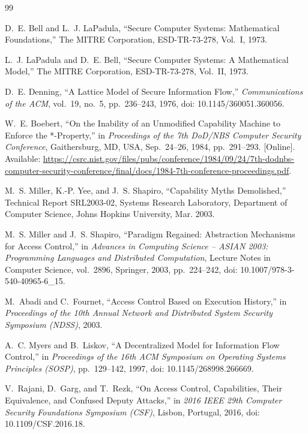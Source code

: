 \documentclass[10pt,twocolumn]{article}
\begin{document}
\begin{thebibliography}{99}

D.~E. Bell and L.~J. LaPadula,
``Secure Computer Systems: Mathematical Foundations,''
The MITRE Corporation, ESD-TR-73-278, Vol.~I, 1973.

L.~J. LaPadula and D.~E. Bell,
``Secure Computer Systems: A Mathematical Model,''
The MITRE Corporation, ESD-TR-73-278, Vol.~II, 1973.

D.~E. Denning,
``A Lattice Model of Secure Information Flow,''
\emph{Communications of the ACM}, vol.~19, no.~5, pp.~236--243, 1976,
doi: 10.1145/360051.360056.

W.~E. Boebert,
``On the Inability of an Unmodified Capability Machine to Enforce the *-Property,''
in \emph{Proceedings of the 7th DoD/NBS Computer Security Conference},
Gaithersburg, MD, USA, Sep.~24--26, 1984, pp.~291--293.
[Online]. Available: \url{https://csrc.nist.gov/files/pubs/conference/1984/09/24/7th-dodnbs-computer-security-conference/final/docs/1984-7th-conference-proceedings.pdf}.

M.~S. Miller, K.-P. Yee, and J.~S. Shapiro,
``Capability Myths Demolished,''
Technical Report SRL2003-02, Systems Research Laboratory,
Department of Computer Science, Johns Hopkins University, Mar. 2003.

M.~S. Miller and J.~S. Shapiro,
``Paradigm Regained: Abstraction Mechanisms for Access Control,''
in \emph{Advances in Computing Science -- ASIAN 2003: Programming Languages and Distributed Computation},
Lecture Notes in Computer Science, vol.~2896, Springer, 2003,
pp.~224--242, doi: 10.1007/978-3-540-40965-6\_15.

M.~Abadi and C.~Fournet,
``Access Control Based on Execution History,''
in \emph{Proceedings of the 10th Annual Network and Distributed System Security Symposium (NDSS)},
2003.

A.~C. Myers and B.~Liskov,
``A Decentralized Model for Information Flow Control,''
in \emph{Proceedings of the 16th ACM Symposium on Operating Systems Principles (SOSP)},
pp.~129--142, 1997, doi: 10.1145/268998.266669.

V.~Rajani, D.~Garg, and T.~Rezk,
``On Access Control, Capabilities, Their Equivalence, and Confused Deputy Attacks,''
in \emph{2016 IEEE 29th Computer Security Foundations Symposium (CSF)},
Lisbon, Portugal, 2016, doi: 10.1109/CSF.2016.18.


\end{thebibliography}
\end{document}
